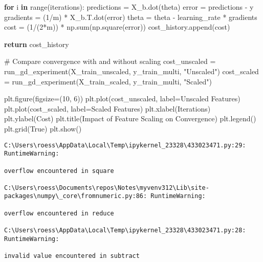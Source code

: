 \documentclass[
  letterpaper,
  DIV=11,
  numbers=noendperiod]{scrreprt}
\newenvironment{Shaded}{\begin{snugshade}}{\end{snugshade}}
\newcommand{\BuiltInTok}[1]{\textcolor[rgb]{0.00,0.23,0.31}{#1}}
\newcommand{\CommentTok}[1]{\textcolor[rgb]{0.37,0.37,0.37}{#1}}
\newcommand{\ControlFlowTok}[1]{\textcolor[rgb]{0.00,0.23,0.31}{\textbf{#1}}}
\newcommand{\DecValTok}[1]{\textcolor[rgb]{0.68,0.00,0.00}{#1}}
\newcommand{\KeywordTok}[1]{\textcolor[rgb]{0.00,0.23,0.31}{\textbf{#1}}}
\newcommand{\NormalTok}[1]{\textcolor[rgb]{0.00,0.23,0.31}{#1}}
\newcommand{\OperatorTok}[1]{\textcolor[rgb]{0.37,0.37,0.37}{#1}}
\newcommand{\StringTok}[1]{\textcolor[rgb]{0.13,0.47,0.30}{#1}}
\newcommand{\VariableTok}[1]{\textcolor[rgb]{0.07,0.07,0.07}{#1}}
\begin{document}
\begin{Shaded}
\begin{Highlighting}[]
    \ControlFlowTok{for}\NormalTok{ i }\KeywordTok{in} \BuiltInTok{range}\NormalTok{(iterations):}
\NormalTok{        predictions }\OperatorTok{=}\NormalTok{ X\_b.dot(theta)}
\NormalTok{        error }\OperatorTok{=}\NormalTok{ predictions }\OperatorTok{{-}}\NormalTok{ y}
\NormalTok{        gradients }\OperatorTok{=}\NormalTok{ (}\DecValTok{1}\OperatorTok{/}\NormalTok{m) }\OperatorTok{*}\NormalTok{ X\_b.T.dot(error)}
\NormalTok{        theta }\OperatorTok{=}\NormalTok{ theta }\OperatorTok{{-}}\NormalTok{ learning\_rate }\OperatorTok{*}\NormalTok{ gradients}
\NormalTok{        cost }\OperatorTok{=}\NormalTok{ (}\DecValTok{1}\OperatorTok{/}\NormalTok{(}\DecValTok{2}\OperatorTok{*}\NormalTok{m)) }\OperatorTok{*}\NormalTok{ np.}\BuiltInTok{sum}\NormalTok{(np.square(error))}
\NormalTok{        cost\_history.append(cost)}
    
    \ControlFlowTok{return}\NormalTok{ cost\_history}

\CommentTok{\# Compare convergence with and without scaling}
\NormalTok{cost\_unscaled }\OperatorTok{=}\NormalTok{ run\_gd\_experiment(X\_train\_unscaled, y\_train\_multi, }\StringTok{"Unscaled"}\NormalTok{)}
\NormalTok{cost\_scaled }\OperatorTok{=}\NormalTok{ run\_gd\_experiment(X\_train\_scaled, y\_train\_multi, }\StringTok{"Scaled"}\NormalTok{)}

\NormalTok{plt.figure(figsize}\OperatorTok{=}\NormalTok{(}\DecValTok{10}\NormalTok{, }\DecValTok{6}\NormalTok{))}
\NormalTok{plt.plot(cost\_unscaled, label}\OperatorTok{=}\StringTok{\textquotesingle{}Unscaled Features\textquotesingle{}}\NormalTok{)}
\NormalTok{plt.plot(cost\_scaled, label}\OperatorTok{=}\StringTok{\textquotesingle{}Scaled Features\textquotesingle{}}\NormalTok{)}
\NormalTok{plt.xlabel(}\StringTok{\textquotesingle{}Iterations\textquotesingle{}}\NormalTok{)}
\NormalTok{plt.ylabel(}\StringTok{\textquotesingle{}Cost\textquotesingle{}}\NormalTok{)}
\NormalTok{plt.title(}\StringTok{\textquotesingle{}Impact of Feature Scaling on Convergence\textquotesingle{}}\NormalTok{)}
\NormalTok{plt.legend()}
\NormalTok{plt.grid(}\VariableTok{True}\NormalTok{)}
\NormalTok{plt.show()}
\end{Highlighting}
\end{Shaded}

\begin{verbatim}
C:\Users\roess\AppData\Local\Temp\ipykernel_23328\433023471.py:29: RuntimeWarning:

overflow encountered in square

C:\Users\roess\Documents\repos\Notes\myvenv312\Lib\site-packages\numpy\_core\fromnumeric.py:86: RuntimeWarning:

overflow encountered in reduce

C:\Users\roess\AppData\Local\Temp\ipykernel_23328\433023471.py:28: RuntimeWarning:

invalid value encountered in subtract
\end{verbatim}
\end{document}
